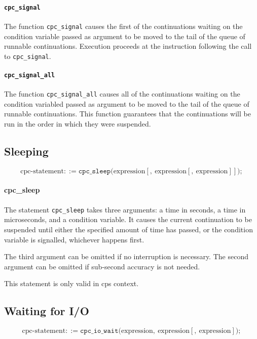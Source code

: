 \documentclass[a4paper]{report}
\begin{document}
\paragraph{\tt cpc\_signal} The function {\tt cpc\_signal} causes the
first of the continuations waiting on the condition variable passed as
argument to be moved to the tail of the queue of runnable
continuations.  Execution proceeds at the instruction following the
call to {\tt cpc\_signal}.

\paragraph{\tt cpc\_signal\_all} The function {\tt cpc\_signal\_all}
causes all of the continuations waiting on the condition variabled
passed as argument to be moved to the tail of the queue of runnable
continuations.  This function guarantees that the continuations will
be run in the order in which they were suspended.

\subsection{Sleeping}

\[ \mbox{cpc-statement} ::=
     \mathtt{cpc\_sleep} \mathtt{(} \mbox{expression}
                                   [ \mathtt{,}\ \mbox{expression}
                                     [ \mathtt{,}\
                                         \mbox{expression} ]]
                         \mathtt{)} \mathtt{;} \]

\paragraph{cpc\_sleep} The statement {\tt cpc\_sleep} takes three
arguments: a time in seconds, a time in microseconds, and a condition
variable.  It causes the current continuation to be suspended until
either the specified amount of time has passed, or the condition
variable is signalled, whichever happens first.

The third argument can be omitted if no interruption is necessary.
The second argument can be omitted if sub-second accuracy is not
needed.

This statement is only valid in cps context.

\subsection{Waiting for I/O}
\[ \mbox{cpc-statement} ::=
   \mathtt{cpc\_io\_wait} \mathtt{(} \mbox{expression}
                                   \mathtt{,}\ \mbox{expression}
                                   [ \mathtt{,}\ \mbox{expression} ]
                         \mathtt{)} \mathtt{;}\]
\end{document}
